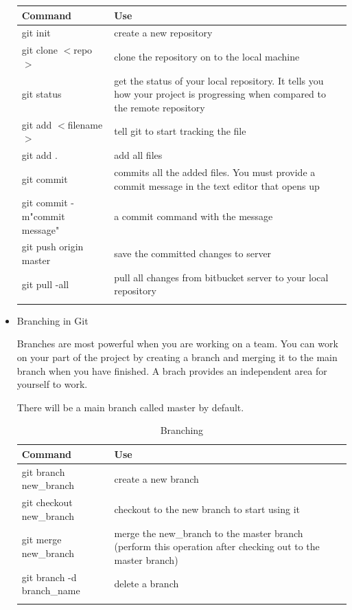 \documentclass{article}
\begin{document}
\begin{itemize}
\begin{table}[htb]
\label{Basic commands in Git}
\begin{tabular}{|p{7cm}|p{7cm}|}
\noalign{\smallskip} \hline \hline \noalign{\smallskip}
Command & Use\\
\hline
git init & create a new repository\\
git clone $<$repo$>$& clone the repository on to the local machine\\
git status &get the status of your local repository. It tells you how your project is progressing when compared to the remote repository\\
git add $<$filename$>$ & tell git to start tracking the file\\
git add . & add all files\\
git commit  & commits all the added files. You must provide a commit message in the text editor that opens up\\
git commit -m"commit message" & a commit command with the message\\
git push origin master & save the committed changes to server\\
git pull -all & pull all changes from bitbucket server to your local repository\\
\noalign{\smallskip} \hline \hline \noalign{\smallskip}
\end{tabular}
\end{table}


\item Branching in Git

Branches are most powerful when you are working on a team. You can work on your part of the project by creating a branch and merging it to the main branch when you have finished. A brach provides an independent area for yourself to work.

There will be a main branch called master by default.

\begin{table}[htb]
\caption{Branching}
\begin{tabular}{|p{7cm}|p{7cm}|}
\noalign{\smallskip} \hline \hline \noalign{\smallskip}
Command & Use\\
\hline
git branch new\_branch & create a new branch \\
git checkout new\_branch & checkout to the new branch to start using it\\
git merge new\_branch & merge the new\_branch to the master branch (perform this operation after checking out to the master branch)\\
git branch -d branch\_name & delete a branch\\
\noalign{\smallskip} \hline \hline \noalign{\smallskip}
\end{tabular}
\end{table}


\end{itemize}
\end{document}
